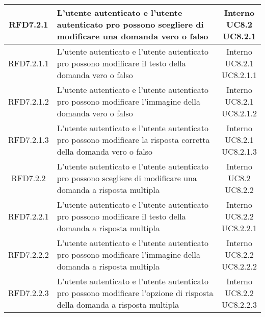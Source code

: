 \begin{longtable}{|c|>{\centering}m{7cm}|c|}
			 \hypertarget{{RFD7.2.1}}{{RFD7.2.1}} & L’utente autenticato e l’utente
autenticato pro possono scegliere di
modificare una domanda vero o falso & \makecell{Interno\\ UC8.2 \\UC8.2.1 } \\ \hline
			 \hypertarget{{RFD7.2.1.1}}{{RFD7.2.1.1}} & L’utente autenticato e l’utente
autenticato pro possono modificare il
testo della domanda vero o falso & \makecell{Interno\\ UC8.2.1 \\UC8.2.1.1 } \\ \hline
			 \hypertarget{{RFD7.2.1.2}}{{RFD7.2.1.2}} & L’utente autenticato e l’utente
autenticato pro possono modificare
l’immagine della domanda vero o falso & \makecell{Interno\\ UC8.2.1 \\UC8.2.1.2 } \\ \hline
			 \hypertarget{{RFD7.2.1.3}}{{RFD7.2.1.3}} & L’utente autenticato e l’utente
autenticato pro possono modificare la
risposta corretta della domanda vero o
falso & \makecell{Interno\\ UC8.2.1 \\UC8.2.1.3 } \\ \hline
			 \hypertarget{{RFD7.2.2}}{{RFD7.2.2}} & L’utente autenticato e l’utente
autenticato pro possono scegliere di
modificare una domanda a risposta
multipla & \makecell{Interno\\ UC8.2 \\UC8.2.2 } \\ \hline
			 \hypertarget{{RFD7.2.2.1}}{{RFD7.2.2.1}} & L’utente autenticato e l’utente
autenticato pro possono modificare il
testo della domanda a risposta multipla & \makecell{Interno\\ UC8.2.2 \\UC8.2.2.1 } \\ \hline
			 \hypertarget{{RFD7.2.2.2}}{{RFD7.2.2.2}} & L’utente autenticato e l’utente
autenticato pro possono modificare
l’immagine della domanda a risposta
multipla & \makecell{Interno\\ UC8.2.2 \\UC8.2.2.2 } \\ \hline
			 \hypertarget{{RFD7.2.2.3}}{{RFD7.2.2.3}} & L’utente autenticato e l’utente
autenticato pro possono modificare
l’opzione di risposta della domanda a
risposta multipla & \makecell{Interno\\ UC8.2.2 \\UC8.2.2.3 } \\ \hline

\end{longtable}
